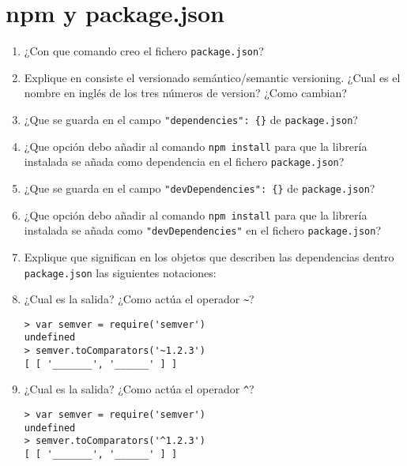 \documentclass[spanish,a4paper,11pt]{article}
\begin{document}
\section{npm y package.json}
\begin{enumerate}
\item 
¿Con que comando creo el fichero \verb|package.json|?
\item 
Explique en consiste el versionado semántico/semantic versioning. ¿Cual es el nombre en
inglés de los tres números de version? ¿Como cambian?
\item 
¿Que se guarda en el campo \verb|"dependencies": {}| de \verb|package.json|?
\item 
¿Que opción debo añadir al comando \verb|npm install| para que la librería instalada se añada
como dependencia en el fichero \verb|package.json|?
\item 
¿Que se guarda en el campo \verb|"devDependencies": {}| de \verb|package.json|?
\item 
¿Que opción debo añadir al comando \verb|npm install| para que la librería instalada se añada
como \verb|"devDependencies"| en el fichero \verb|package.json|?
\item 
Explique que significan en los objetos que describen las dependencias 
dentro \verb|package.json|  las siguientes notaciones:
\item  ¿Cual es la salida? 
¿Como actúa el operador \verb|~|?
\begin{verbatim}
> var semver = require('semver')
undefined
> semver.toComparators('~1.2.3')
[ [ '_______', '______' ] ]
\end{verbatim}
\item  ¿Cual es la salida?
¿Como actúa el operador \verb|^|?
\begin{verbatim}
> var semver = require('semver')
undefined
> semver.toComparators('^1.2.3')
[ [ '_______', '______' ] ]
\end{verbatim}
\end{enumerate}
\end{document}
